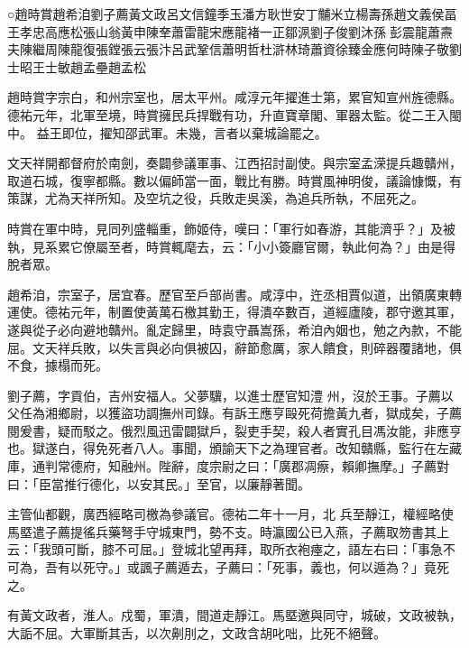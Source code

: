 
\begin{pinyinscope}

 ○趙時賞趙希洎劉子薦黃文政呂文信鐘季玉潘方耿世安丁黼米立楊壽孫趙文義侯畐
 王孝忠高應松張山翁黃申陳羍蕭雷龍宋應龍褚一正鄒洬劉子俊劉沐孫𬃄彭震龍蕭燾夫陳繼周陳龍復張鏜張云張汴呂武鞏信蕭明哲杜滸林琦蕭資徐臻金應何時陳子敬劉士昭王士敏趙孟壘趙孟松



 趙時賞字宗白，和州宗室也，居太平州。咸淳元年擢進士第，累官知宣州旌德縣。德祐元年，北軍至境，時賞擁民兵捍戰有功，升直寶章閣、軍器太監。從二王入閩中。
 益王即位，擢知邵武軍。未幾，言者以棄城論罷之。



 文天祥開都督府於南劍，奏闢參議軍事、江西招討副使。與宗室孟溁提兵趣贛州，取道石城，復寧都縣。數以偏師當一面，戰比有勝。時賞風神明俊，議論慷慨，有策謀，尤為天祥所知。及空坑之役，兵敗走吳溪，為追兵所執，不屈死之。



 時賞在軍中時，見同列盛輜重，飾姬侍，嘆曰：「軍行如春游，其能濟乎？」及被執，見系累它僚屬至者，時賞輒麾去，云：「小小簽廳官爾，執此何為？」由是得脫者眾。



 趙希洎，宗室子，居宜春。歷官至戶部尚書。咸淳中，迕丞相賈似道，出領廣東轉運使。德祐元年，制置使黃萬石檄其勤王，得潰卒數百，道經廬陵，郡守邀其軍，遂與從子必向避地贛州。亂定歸里，時袁守聶嵩孫，希洎內姻也，勉之內款，不能屈。文天祥兵敗，以失言與必向俱被囚，辭節愈厲，家人饋食，則碎器覆諸地，俱不食，據榻而死。



 劉子薦，字貢伯，吉州安福人。父夢驥，以進士歷官知澧
 州，沒於王事。子薦以父任為湘鄉尉，以獲盜功調撫州司錄。有訴王應亨毆死荷擔黃九者，獄成矣，子薦閱爰書，疑而駁之。俄烈風迅雷闢獄戶，裂吏手契，殺人者實孔目馮汝能，非應亨也。獄遂白，得免死者八人。事聞，頒諭天下之為理官者。改知贛縣，監行在左藏庫，通判常德府，知融州。陛辭，度宗尉之曰：「廣郡凋瘵，賴卿撫摩。」子薦對曰：「臣當推行德化，以安其民。」至官，以廉靜著聞。



 主管仙都觀，廣西經略司檄為參議官。德祐二年十一月，北
 兵至靜江，權經略使馬塈遣子薦提徭兵藥弩手守城東門，勢不支。時瀛國公已入燕，子薦取笏書其上云：「我頭可斷，膝不可屈。」登城北望再拜，取所衣袍瘞之，語左右曰：「事急不可為，吾有以死守。」或諷子薦遁去，子薦曰：「死事，義也，何以遁為？」竟死之。



 有黃文政者，淮人。戍蜀，軍潰，間道走靜江。馬塈邀與同守，城破，文政被執，大詬不屈。大軍斷其舌，以次劓刖之，文政含胡叱咄，比死不絕聲。




\end{pinyinscope}
